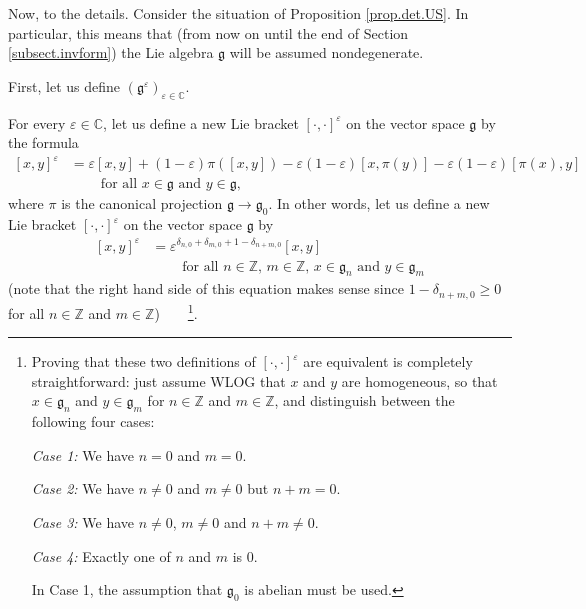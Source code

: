 \documentclass[etingof-lie.tex]{subfiles}
\begin{document}
Now, to the details. Consider the situation of Proposition \ref{prop.det.US}.
In particular, this means that (from now on until the end of Section
\ref{subsect.invform}) the Lie algebra $\mathfrak{g}$ will be assumed nondegenerate.

First, let us define $\left(  \mathfrak{g}^{\varepsilon}\right)
_{\varepsilon\in\mathbb{C}}$.

For every $\varepsilon\in\mathbb{C}$, let us define a new Lie bracket $\left[
\cdot,\cdot\right]  ^{\varepsilon}$ on the vector space $\mathfrak{g}$ by the
formula%
\begin{align}
\left[  x,y\right]  ^{\varepsilon}  &  =\varepsilon\left[  x,y\right]
+\left(  1-\varepsilon\right)  \pi\left(  \left[  x,y\right]  \right)
-\varepsilon\left(  1-\varepsilon\right)  \left[  x,\pi\left(  y\right)
\right]  -\varepsilon\left(  1-\varepsilon\right)  \left[  \pi\left(
x\right)  ,y\right] \label{pf.invformnondeg.g^epsi.1}\\
&  \ \ \ \ \ \ \ \ \ \ \text{for all }x\in\mathfrak{g}\text{ and }%
y\in\mathfrak{g},\nonumber
\end{align}
where $\pi$ is the canonical projection $\mathfrak{g}\rightarrow
\mathfrak{g}_{0}$. In other words, let us define a new Lie bracket $\left[
\cdot,\cdot\right]  ^{\varepsilon}$ on the vector space $\mathfrak{g}$ by%
\begin{align}
\left[  x,y\right]  ^{\varepsilon}  &  =\varepsilon^{\delta_{n,0}+\delta
_{m,0}+1-\delta_{n+m,0}}\left[  x,y\right]  \label{pf.invformnondeg.g^epsi.2}%
\\
&  \ \ \ \ \ \ \ \ \ \ \text{for all }n\in\mathbb{Z}\text{, }m\in
\mathbb{Z}\text{, }x\in\mathfrak{g}_{n}\text{ and }y\in\mathfrak{g}%
_{m}\nonumber
\end{align}
(note that the right hand side of this equation makes sense since
$1-\delta_{n+m,0}\geq0$ for all $n\in\mathbb{Z}$ and $m\in\mathbb{Z}%
$)\ \ \ \ \footnote{Proving that these two definitions of $\left[  \cdot
,\cdot\right]  ^{\varepsilon}$ are equivalent is completely straightforward:
just assume WLOG that $x$ and $y$ are homogeneous, so that $x\in
\mathfrak{g}_{n}$ and $y\in\mathfrak{g}_{m}$ for $n\in\mathbb{Z}$ and
$m\in\mathbb{Z}$, and distinguish between the following four cases:
\par
\textit{Case 1:} We have $n=0$ and $m=0$.
\par
\textit{Case 2:} We have $n\neq0$ and $m\neq0$ but $n+m=0$.
\par
\textit{Case 3:} We have $n\neq0$, $m\neq0$ and $n+m\neq0$.
\par
\textit{Case 4:} Exactly one of $n$ and $m$ is $0$.
\par
In Case 1, the assumption that $\mathfrak{g}_{0}$ is abelian must be used.}.
\end{document}
